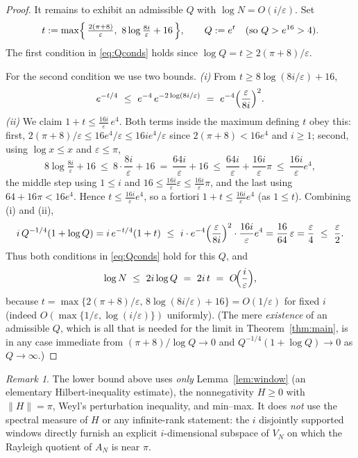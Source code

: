 \documentclass[12pt]{article}
\theoremstyle{remark}
\newtheorem*{remark}{Remark}
\begin{document}
\begin{proof}
It remains to exhibit an admissible $Q$ with $\log N=O(i/\varepsilon)$. Set
\[
t:=\max\Bigl\{\,\tfrac{2(\pi+8)}{\varepsilon},\ 8\log\tfrac{8i}{\varepsilon}+16\,\Bigr\},
\qquad Q:=e^{t}\quad(\text{so }Q>e^{16}>4).
\]
The first condition in \eqref{eq:Qconds} holds since $\log Q=t\ge 2(\pi+8)/\varepsilon$.

For the second condition we use two bounds. \emph{(i)} From $t\ge 8\log(8i/\varepsilon)+16$,
\[
e^{-t/4}\ \le\ e^{-4}\,e^{-2\log(8i/\varepsilon)}\ =\ e^{-4}\Bigl(\frac{\varepsilon}{8i}\Bigr)^{2}.
\]
\emph{(ii)} We claim $1+t\le \tfrac{16i}{\varepsilon}\,e^{4}$. Both terms inside the maximum
defining $t$ obey this: first, $2(\pi+8)/\varepsilon\le 16 e^{4}/\varepsilon\le 16ie^{4}/\varepsilon$
since $2(\pi+8)<16e^{4}$ and $i\ge1$; second, using $\log x\le x$ and $\varepsilon\le\pi$,
\[
8\log\tfrac{8i}{\varepsilon}+16\ \le\ 8\cdot\frac{8i}{\varepsilon}+16\ =\ \frac{64i}{\varepsilon}+16
\ \le\ \frac{64i}{\varepsilon}+\frac{16i}{\varepsilon}\pi\ \le\ \frac{16i}{\varepsilon}e^{4},
\]
the middle step using $1\le i$ and $16\le \tfrac{16i}{\varepsilon}\varepsilon\le\tfrac{16i}{\varepsilon}\pi$,
and the last using $64+16\pi<16e^{4}$. Hence $t\le\tfrac{16i}{\varepsilon}e^4$, so a fortiori
$1+t\le\tfrac{16i}{\varepsilon}e^{4}$ (as $1\le t$). Combining (i) and (ii),
\[
i\,Q^{-1/4}(1+\log Q)=i\,e^{-t/4}(1+t)\ \le\
i\cdot e^{-4}\Bigl(\frac{\varepsilon}{8i}\Bigr)^{2}\cdot\frac{16i}{\varepsilon}e^{4}
=\frac{16}{64}\,\varepsilon=\frac{\varepsilon}{4}\ \le\ \frac{\varepsilon}{2}.
\]
Thus both conditions in \eqref{eq:Qconds} hold for this $Q$, and
\[
\log N\ \le\ 2i\log Q\ =\ 2i\,t\ =\ O\!\Bigl(\frac{i}{\varepsilon}\Bigr),
\]
because $t=\max\{2(\pi+8)/\varepsilon,\,8\log(8i/\varepsilon)+16\}=O(1/\varepsilon)$ for fixed $i$
(indeed $O(\max\{1/\varepsilon,\log(i/\varepsilon)\})$ uniformly).
(The mere \emph{existence} of an admissible $Q$, which is all that is needed for the limit in
Theorem~\ref{thm:main}, is in any case immediate from $(\pi+8)/\log Q\to0$ and
$Q^{-1/4}(1+\log Q)\to0$ as $Q\to\infty$.)
\end{proof}

\begin{remark}
The lower bound above uses \emph{only} Lemma~\ref{lem:window} (an elementary Hilbert-inequality
estimate), the nonnegativity $H\ge0$ with $\|H\|=\pi$, Weyl's perturbation inequality, and
min--max. It does \emph{not} use the spectral measure of $H$ or any infinite-rank statement: the
$i$ disjointly supported windows directly furnish an explicit $i$-dimensional subspace of $V_N$ on
which the Rayleigh quotient of $A_N$ is near $\pi$.
\end{remark}
\end{document}
